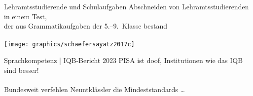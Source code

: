 \begin{frame}
  {Lehramtsstudierende und Schulaufgaben}
  \onslide<+->
  \onslide<+->
  Abschneiden von Lehramtsstudierenden in einem Test,\\
  der aus Grammatikaufgaben der 5.--9.~Klasse bestand\\
  \\
  \onslide<+->
  \centering 
  \texttt{[image: graphics/schaefersayatz2017c]}
\end{frame}

\begin{frame}
  {Sprachkompetenz | IQB-Bericht 2023}
  \onslide<+->
  \onslide<+->
  PISA ist doof, Institutionen wie das \alert{IQB} sind besser!\\
  \\
  \onslide<+->
  \Doppelzeile
  \centering
  Bundesweit verfehlen Neuntklässler die Mindeststandards \ldots\\
  \Halbzeile
  \onslide<+->
  \\
  \onslide<+->
  \Halbzeile
  \\
  \onslide<+->
  \Halbzeile
  \\
  \onslide<+->
  \Halbzeile
  \\
\end{frame}

